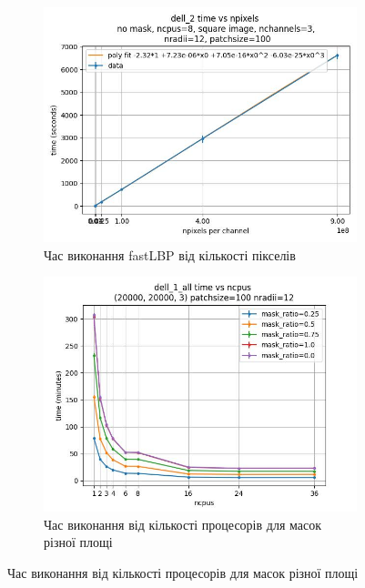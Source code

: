 \begin{figure}[h]
    \begin{subfigure}{0.45\textwidth}
    \includegraphics[width=0.99\linewidth]{img/fastlbp/complexity-time_npixels_nc3.jpg}
    \caption{
        Час виконання fastLBP від кількості пікселів
    }
    \label{fig:time-vs-npixels}
    \end{subfigure}%
    \begin{subfigure}{0.45\textwidth}
    \includegraphics[width=0.99\linewidth]{img/fastlbp/time_ncpus.jpg} 
    \caption{
        Час виконання від кількості процесорів для масок різної площі
    }
    \label{fig:parallell-efficiency-a}
    \end{subfigure}


\end{figure}
